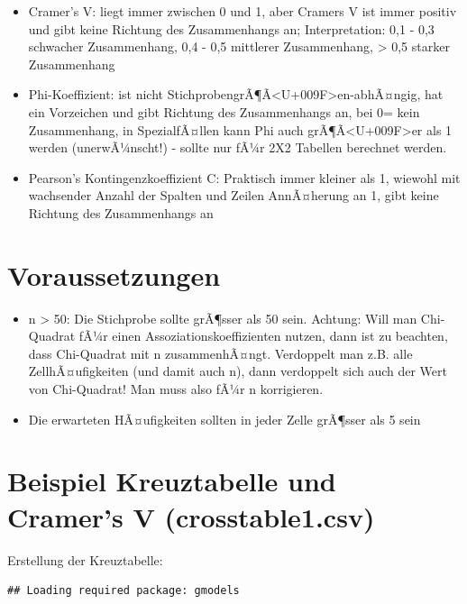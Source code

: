 \documentclass[
]{book}
\providecommand{\tightlist}{%
  \setlength{\itemsep}{0pt}\setlength{\parskip}{0pt}}
\begin{document}
\begin{itemize}
\tightlist
\item
  Cramer's V: liegt immer zwischen 0 und 1, aber Cramers V ist immer positiv und gibt keine Richtung des Zusammenhangs an; Interpretation: 0,1 - 0,3 schwacher Zusammenhang, 0,4 - 0,5 mittlerer Zusammenhang, \textgreater{} 0,5 starker Zusammenhang
\item
  Phi-Koeffizient: ist nicht StichprobengrÃ¶Ã\textless U+009F\textgreater en-abhÃ¤ngig, hat ein Vorzeichen und gibt Richtung des Zusammenhangs an, bei 0= kein Zusammenhang, in SpezialfÃ¤llen kann Phi auch grÃ¶Ã\textless U+009F\textgreater er als 1 werden (unerwÃ¼nscht!) - sollte nur fÃ¼r 2X2 Tabellen berechnet werden.
\item
  Pearson's Kontingenzkoeffizient C: Praktisch immer kleiner als 1, wiewohl mit wachsender Anzahl der Spalten und Zeilen AnnÃ¤herung an 1, gibt keine Richtung des Zusammenhangs an
\end{itemize}

\hypertarget{voraussetzungen}{%
\section{Voraussetzungen}\label{voraussetzungen}}

\begin{itemize}
\tightlist
\item
  n \textgreater{} 50: Die Stichprobe sollte grÃ¶sser als 50 sein. Achtung: Will man Chi-Quadrat fÃ¼r einen Assoziationskoeffizienten nutzen, dann ist zu beachten, dass Chi-Quadrat mit n zusammenhÃ¤ngt.
  Verdoppelt man z.B. alle ZellhÃ¤ufigkeiten (und damit auch n), dann verdoppelt sich auch der Wert von Chi-Quadrat! Man muss also fÃ¼r n korrigieren.
\item
  Die erwarteten HÃ¤ufigkeiten sollten in jeder Zelle grÃ¶sser als 5 sein
\end{itemize}

\hypertarget{beispiel-kreuztabelle-und-cramers-v-crosstable1.csv}{%
\section{Beispiel Kreuztabelle und Cramer's V (crosstable1.csv)}\label{beispiel-kreuztabelle-und-cramers-v-crosstable1.csv}}

Erstellung der Kreuztabelle:

\begin{verbatim}
## Loading required package: gmodels
\end{verbatim}
\end{document}
